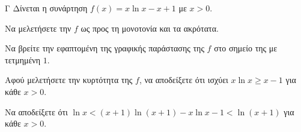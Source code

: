 \begin{thema}{Γ}
Δίνεται η συνάρτηση $f(x) = x \ln x - x + 1$ με $x > 0$.
\begin{erwthma}
  \item Να μελετήσετε την $f$ ως προς τη μονοτονία και τα ακρότατα.
  \item Να βρείτε την εφαπτομένη της γραφικής παράστασης της $f$ στο σημείο της με τετμημένη $1$.
  \item Αφού μελετήσετε την κυρτότητα της $f$, να αποδείξετε ότι ισχύει $x \ln x \ge x - 1$ για κάθε $x > 0$.
  \item  Να αποδείξετε ότι $\ln x < (x+1)\ln(x+1) - x\ln x - 1 < \ln(x+1)$ για κάθε $x > 0$.
\end{erwthma}
\end{thema}
